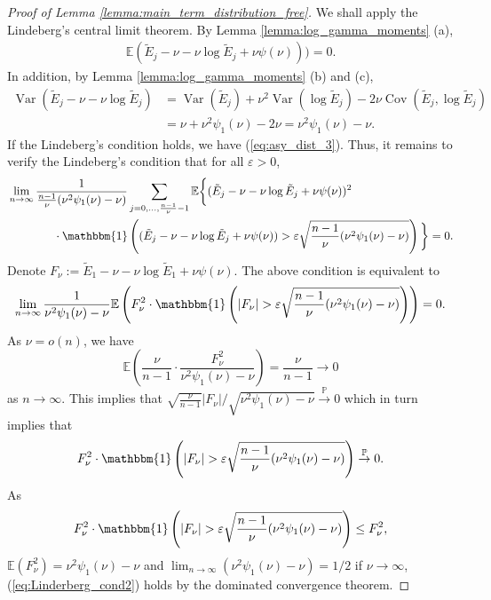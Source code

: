 \documentclass[12pt,letterpaper, twoside, openany]{article}
\DeclareMathOperator*{\Var}{Var}
\DeclareMathOperator*{\Cov}{Cov}
\theoremstyle{plain}
\begin{document}
\begin{proof}[Proof of Lemma \ref{lemma:main_term_distribution_free}]
We shall apply the Lindeberg's central limit theorem. By Lemma \ref{lemma:log_gamma_moments} (a),
\begin{align*}
	\mathbb{E}(\tilde{E}_j - \nu - \nu \log \tilde{E}_j + \nu \psi(\nu))) = 0.
\end{align*}
In addition, by Lemma \ref{lemma:log_gamma_moments} (b) and (c), 
\begin{align*}
	\Var(\tilde{E}_j - \nu - \nu \log \tilde{E}_j) &= \Var(\tilde{E}_j) + \nu^2 \Var(\log \tilde{E}_j) -2\nu\Cov(\tilde{E}_j, \log \tilde{E}_j) \\
	&= \nu + \nu^2 \psi_1(\nu) - 2\nu = \nu^2 \psi_1(\nu) - \nu.
\end{align*}
If the Lindeberg's condition holds, we have (\ref{eq:asy_dist_3}).
Thus, it remains to verify the Lindeberg's condition  that for all $\varepsilon  >0$,
\begin{align*}
&	\lim_{n\rightarrow \infty}\frac{1}{\frac{n-1}{\nu}(\nu^2\psi_1(\nu) - \nu)} \sum_{j=0,\ldots,\frac{n-1}{\nu}-1}\mathbb{E} \bigg\{ (\tilde{E}_j - \nu - \nu \log \tilde{E}_j + \nu\psi(\nu))^2\\
&	\quad \quad \quad \quad  \cdot \mathbbm{1}\left((\tilde{E}_j - \nu - \nu \log \tilde{E}_j + \nu\psi(\nu)) > \varepsilon \sqrt{ \frac{n-1}{\nu}(\nu^2\psi_1(\nu)-\nu)}\right) \bigg\}= 0.
\end{align*}
Denote $F_\nu := \tilde{E}_1 -\nu-\nu\log \tilde{E}_1 +\nu\psi(\nu)$. The above condition is equivalent to
\begin{equation}\label{eq:Linderberg_cond2}
	\lim_{n\rightarrow \infty} \frac{1}{\nu^2\psi_1(\nu) - \nu} \mathbb{E}\left(F^2_\nu\cdot \mathbbm{1}\left(|F_\nu| > \varepsilon \sqrt{ \frac{n-1}{\nu}(\nu^2\psi_1(\nu)-\nu)}\right) \right)=0.
\end{equation}
As $\nu = o(n)$, we have
\begin{equation*}
	\mathbb{E} \left( \frac{\nu}{n-1} \cdot \frac{F^2_\nu}{\nu^2\psi_1(\nu)-\nu}\right) = \frac{\nu}{n-1} \rightarrow 0
\end{equation*}
as $n \rightarrow \infty$. This implies that $\sqrt{\frac{\nu}{n-1}} |F_\nu|/\sqrt{\nu^2\psi_1(\nu)-\nu} \stackrel{\mathbb{P}}{\rightarrow} 0 $ which in turn implies that
\begin{equation*}
	F^2_\nu\cdot \mathbbm{1}\left(|F_\nu| > \varepsilon \sqrt{ \frac{n-1}{\nu}(\nu^2\psi_1(\nu)-\nu)}\right) \stackrel{\mathbb{P}}{\rightarrow} 0.
\end{equation*}
As 
\begin{equation*}
		F^2_\nu\cdot \mathbbm{1}\left(|F_\nu| > \varepsilon \sqrt{ \frac{n-1}{\nu}(\nu^2\psi_1(\nu)-\nu)}\right) \leq F^2_\nu,
\end{equation*}
$\mathbb{E}(F^2_\nu) = \nu^2\psi_1(\nu) -\nu$ and $\lim_{n \rightarrow \infty}(\nu^2 \psi_1(\nu) - \nu) = 1/2$ if $\nu \rightarrow \infty$, (\ref{eq:Linderberg_cond2}) holds by the dominated convergence theorem.


\end{proof}
\end{document}
